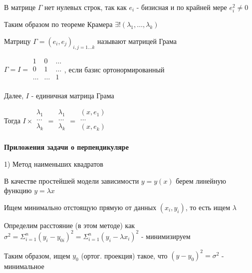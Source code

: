 \documentclass[12pt]{article}
\begin{document}
    \Nota В матрице $\Gamma$ нет нулевых строк, так как $e_i$ - бизисная и по крайней мере $e_i^2 \neq 0$

    Таким образом по теореме Крамера $\exists! (\lambda_1, \dots, \lambda_k)$

    \hypertarget{grammatrix}{}

    \Def Матрицу $\Gamma = {(e_i, e_j)}_{i, j = 1\dots k}$ называют матрицей Грама

    $\Gamma = I = \begin{array}{|ccc|}
    1 & 0 & \ldots\\
    0 & 1 & \ldots\\
    \ldots & \ldots & 1\\
    \end{array}$, если базис ортонормированный

    Далее, $I$ - единичная матрица Грама

    \Nota Тогда $I \times \begin{array}{|c|}
    \lambda_1\\
    \ldots\\
    \lambda_k \\
    \end{array} = \begin{array}{|c|}
    \lambda_1\\
    \ldots\\
    \lambda_k \\
    \end{array} = \begin{array}{|c|}
    (x,e_1)\\
    \ldots\\
    (x,e_k) \\
    \end{array}$

    \vspace{5mm}

    \textbf{Приложения задачи о перпендикуляре}

    1) Метод наименьших квадратов

    В качестве простейшей модели зависимости $y = y(x)$ берем линейную функцию $y = \lambda x$

    Ищем минимально отстоящую прямую от данных $(x_i, y_i)$, то есть ищем $\lambda$

    Определим расстояние (в этом методе) как $\sigma^2 = \Sigma^n_{i=1} (y_i - y_{0i})^2 = \Sigma^n_{i=1} (y_i - \lambda x_i)^2$ - минимизируем

    Таким образом, ищем $y_0$ (ортог. проекция) такое, что $(y - y_0)^2 = \sigma^2$ - минимальное
\end{document}
